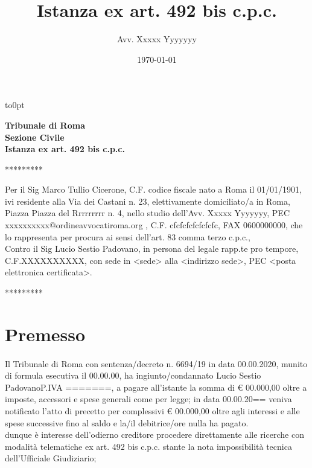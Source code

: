 \documentclass [12pt]{article}
\newcommand{\trib}{Tribunale di Roma}
\newcommand{\sez}{Sezione Civile}
\newcommand{\ric}{Marco Tullio Cicerone}\label{ricorrente}
\newcommand{\res}{Lucio Sestio Padovano}\label{resistente}
\begin{document}
\author{Avv. Xxxxx Yyyyyyy}
\title{Istanza ex art. 492 bis c.p.c.}
\date{\today}
	\vspace*{-1cm}\vbox to0pt{
		\vss\vbox{	
			}
		\vspace{.1cm}}
\begin{center}
\textbf{\textbf{\trib\\
\sez\\
Istanza ex art. 492 bis c.p.c.}}
\end{center}
\tableofcontents
\begin{center}
*********
\end{center}
Per il Sig \ric ,  C.F. codice fiscale nato a Roma il 01/01/1901, ivi residente alla Via dei Castani n. 23, elettivamente domiciliato/a in Roma, Piazza Piazza del Rrrrrrrrr n. 4, nello studio dell'Avv. Xxxxx Yyyyyyy, PEC xxxxxxxxxx@ordineavvocatiroma.org , C.F. cfcfcfcfcfcfcfc,  FAX 0600000000, che lo rappresenta per procura ai sensi dell'art. 83 comma terzo c.p.c.,\\
Contro il Sig \res , in persona del legale rapp.te pro tempore, C.F.XXXXXXXXXX, con sede in <sede> alla <indirizzo sede>, PEC <posta elettronica certificata>.
\begin{center}
*********
\end{center}
\section{Premesso}\label{premesso} 
\paragraph{}
Il Tribunale di Roma con sentenza/decreto n. 6694/19 in data 00.00.2020, munito di formula esecutiva il 00.00.00, ha ingiunto/condannato \res P.IVA =======, a pagare all’istante la somma di € 00.000,00 oltre a imposte, accessori e spese generali come per legge;
in data 00.00.20==  veniva notificato l’atto di precetto per complessivi € 00.000,00 oltre agli interessi e alle spese successive fino al saldo e la/il debitrice/ore nulla ha pagato.
\\
dunque è interesse dell’odierno creditore procedere direttamente alle ricerche con modalità telematiche ex art. 492 bis c.p.c. stante la nota impossibilità tecnica dell’Ufficiale Giudiziario;\\
\end{document}
